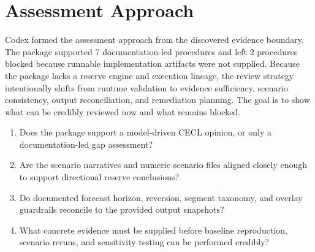 \documentclass[11pt]{article}
\begin{document}
\section*{Assessment Approach}
Codex formed the assessment approach from the discovered evidence boundary. The package supported 7 documentation-led procedures and left 2 procedures blocked because runnable implementation artifacts were not supplied.
Because the package lacks a reserve engine and execution lineage, the review strategy intentionally shifts from runtime validation to evidence sufficiency, scenario consistency, output reconciliation, and remediation planning. The goal is to show what can be credibly reviewed now and what remains blocked.
\begin{enumerate}
\item Does the package support a model-driven CECL opinion, or only a documentation-led gap assessment?
\item Are the scenario narratives and numeric scenario files aligned closely enough to support directional reserve conclusions?
\item Do documented forecast horizon, reversion, segment taxonomy, and overlay guardrails reconcile to the provided output snapshots?
\item What concrete evidence must be supplied before baseline reproduction, scenario reruns, and sensitivity testing can be performed credibly?
\end{enumerate}
\end{document}
